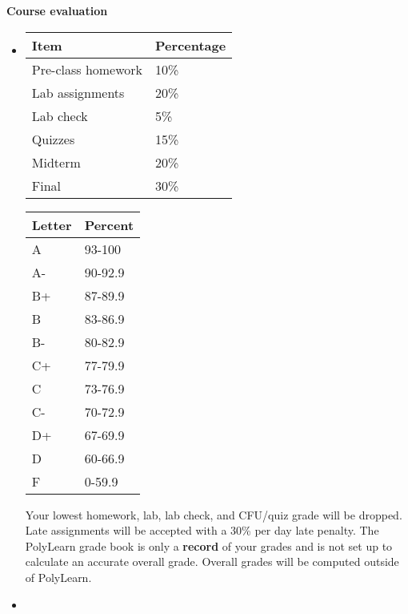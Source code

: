 \documentclass[letterpaper,12pt]{report}
\begin{document}
\textbf{Course evaluation}
\begin{itemize}
\item[]
\begin{minipage}{0.35\textwidth}
{\renewcommand{\arraystretch}{1.2}
\begin{tabular}{|ll|}
\hline
Item & Percentage \\
\hline
Pre-class homework & 10\% \\
Lab assignments    & 20\% \\
Lab check          & 5\% \\
Quizzes            & 15\% \\
Midterm            & 20\%  \\
Final              & 30\% \\
\hline
\end{tabular}}
\vskip30pt
\end{minipage}
\begin{minipage}{0.05\textwidth} \hspace{0.05in} \end{minipage}
\begin{minipage}{0.17\textwidth}
\begin{tabular}{|ll|}
\hline
Letter & Percent \\
\hline
A	&	93-100	\\
A-	&	90-92.9	\\
B+	&	87-89.9	\\
B	&	83-86.9	\\
B-	&	80-82.9	\\
C+	&	77-79.9	\\
C	&	73-76.9	\\
C-	&	70-72.9	\\
D+	&	67-69.9	\\
D	&	60-66.9	\\
F	&	0-59.9	\\
\hline
\end{tabular}
\end{minipage}
\begin{minipage}{0.05\textwidth} \hspace{0.05in} \end{minipage}
\begin{minipage}{0.35\textwidth}
Your lowest homework, lab, lab check, and CFU/quiz grade will be dropped. Late assignments will be accepted with a 30\% per day late penalty.  The PolyLearn grade book is only a \textbf{record} of your grades and is not set up to calculate an accurate overall grade.  Overall grades will be computed outside of PolyLearn.
\vskip20pt
\end{minipage}
\item[]
\end{itemize}
\end{document}
